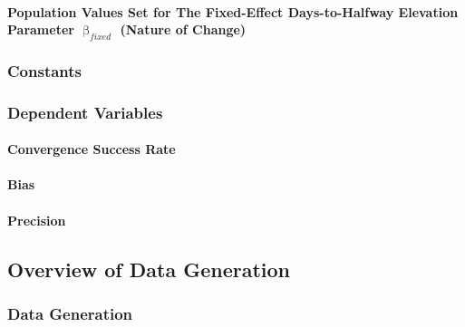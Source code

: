\documentclass[
12pt, %
twoside,
english]{guelphthesis}
\begin{document}
\hypertarget{population-values-set-for-the-fixed-effect-days-to-halfway-elevation-parameter-upbeta_fixed-nature-of-change}{%
\paragraph{\texorpdfstring{Population Values Set for The Fixed-Effect Days-to-Halfway Elevation Parameter \(\upbeta_{fixed}\) (Nature of Change)}{Population Values Set for The Fixed-Effect Days-to-Halfway Elevation Parameter \textbackslash upbeta\_\{fixed\} (Nature of Change)}}\label{population-values-set-for-the-fixed-effect-days-to-halfway-elevation-parameter-upbeta_fixed-nature-of-change}}

\hypertarget{constants}{%
\subsubsection{Constants}\label{constants}}

\hypertarget{dependent-variables}{%
\subsubsection{Dependent Variables}\label{dependent-variables}}

\hypertarget{convergence}{%
\paragraph{Convergence Success Rate}\label{convergence}}

\hypertarget{bias-comp}{%
\paragraph{Bias}\label{bias-comp}}

\hypertarget{pres-precision}{%
\paragraph{Precision}\label{pres-precision}}

\hypertarget{data-generation}{%
\subsection{Overview of Data Generation}\label{data-generation}}

\hypertarget{data-generation-1}{%
\subsubsection{Data Generation}\label{data-generation-1}}
\end{document}

